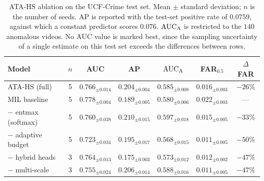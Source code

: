 \begin{table}[htbp]
\centering
\caption{ATA-HS ablation on the UCF-Crime test set. Mean $\pm$ standard deviation; $n$ is the number of seeds. AP is reported with the test-set positive rate of $0.0759$, against which a constant predictor scores $0.076$. $\text{AUC}_{\mathrm{A}}$ is restricted to the $140$ anomalous videos. No AUC value is marked best, since the sampling uncertainty of a single estimate on this test set exceeds the differences between rows.}
\label{tab:main}
\small
\begin{tabular}{lcccccc}
\toprule
Model & $n$ & AUC & AP & $\text{AUC}_{\mathrm{A}}$ & FAR$_{0.5}$ & $\Delta$FAR \\
\midrule
ATA-HS (full) & 5 & $0.766_{\pm0.014}$ & $0.204_{\pm0.004}$ & $0.585_{\pm0.008}$ & $0.016_{\pm0.003}$ & $-26\%$ \\
MIL baseline \citep{sultani2018real} & 5 & $0.778_{\pm0.004}$ & $0.189_{\pm0.005}$ & $0.580_{\pm0.006}$ & $0.022_{\pm0.003}$ & --- \\
\midrule
\quad $-$ entmax (softmax) & 5 & $0.760_{\pm0.038}$ & $\mathbf{0.210}_{\pm0.015}$ & $\mathbf{0.597}_{\pm0.018}$ & $0.015_{\pm0.005}$ & $-33\%$ \\
\quad $-$ adaptive budget & 5 & $0.723_{\pm0.034}$ & $0.195_{\pm0.017}$ & $0.568_{\pm0.015}$ & $\mathbf{0.011}_{\pm0.005}$ & $-50\%$ \\
\quad $-$ hybrid heads & 3 & $0.764_{\pm0.013}$ & $0.175_{\pm0.003}$ & $0.573_{\pm0.012}$ & $0.012_{\pm0.002}$ & $-47\%$ \\
\quad $-$ multi-scale & 3 & $0.755_{\pm0.024}$ & $0.206_{\pm0.014}$ & $0.588_{\pm0.016}$ & $0.011_{\pm0.005}$ & $-47\%$ \\
\bottomrule
\end{tabular}
\end{table}
